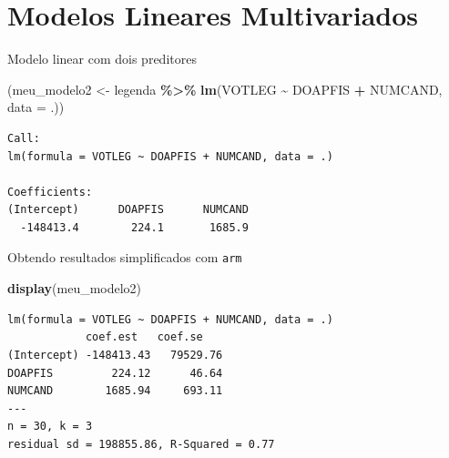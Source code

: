 \documentclass[
  9pt,
  ignorenonframetext,
  aspectratio=169]{beamer}
\newenvironment{Shaded}{\begin{snugshade}}{\end{snugshade}}
\newcommand{\DataTypeTok}[1]{\textcolor[rgb]{0.13,0.29,0.53}{#1}}
\newcommand{\KeywordTok}[1]{\textcolor[rgb]{0.13,0.29,0.53}{\textbf{#1}}}
\newcommand{\NormalTok}[1]{#1}
\newcommand{\OperatorTok}[1]{\textcolor[rgb]{0.81,0.36,0.00}{\textbf{#1}}}
\newcommand{\StringTok}[1]{\textcolor[rgb]{0.31,0.60,0.02}{#1}}
\begin{document}
\hypertarget{modelos-lineares-multivariados}{%
\section{Modelos Lineares
Multivariados}\label{modelos-lineares-multivariados}}

\begin{frame}[fragile]{Modelo linear com dois preditores}
\protect\hypertarget{modelo-linear-com-dois-preditores}{}
\begin{Shaded}
\begin{Highlighting}[]
\NormalTok{(meu\_modelo2 \textless{}{-}}\StringTok{ }\NormalTok{legenda }\OperatorTok{\%\textgreater{}\%}\StringTok{ }\KeywordTok{lm}\NormalTok{(VOTLEG }\OperatorTok{\textasciitilde{}}\StringTok{ }\NormalTok{DOAPFIS }\OperatorTok{+}\StringTok{ }\NormalTok{NUMCAND, }\DataTypeTok{data =}\NormalTok{ .))}
\end{Highlighting}
\end{Shaded}

\begin{verbatim}
Call:
lm(formula = VOTLEG ~ DOAPFIS + NUMCAND, data = .)

Coefficients:
(Intercept)      DOAPFIS      NUMCAND  
  -148413.4        224.1       1685.9  
\end{verbatim}
\end{frame}

\begin{frame}[fragile]{Obtendo resultados simplificados com
\texttt{arm}}
\protect\hypertarget{obtendo-resultados-simplificados-com-arm}{}
\begin{Shaded}
\begin{Highlighting}[]
\KeywordTok{display}\NormalTok{(meu\_modelo2)}
\end{Highlighting}
\end{Shaded}

\begin{verbatim}
lm(formula = VOTLEG ~ DOAPFIS + NUMCAND, data = .)
            coef.est   coef.se   
(Intercept) -148413.43   79529.76
DOAPFIS         224.12      46.64
NUMCAND        1685.94     693.11
---
n = 30, k = 3
residual sd = 198855.86, R-Squared = 0.77
\end{verbatim}
\end{frame}
\end{document}

